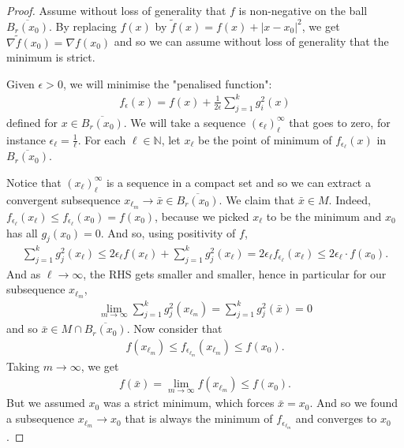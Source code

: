 \begin{proof}
	Assume without loss of generality that $f$ is non-negative on the ball $\overline{ B_{r}(x_{0}) }$. By replacing $f(x)$ by $\tilde{f}(x) = f(x) + \left| x-x_{0} \right|^{2}$, we get $\nabla \tilde{f}(x_{0}) = \nabla f(x_{0})$ and so we can assume without loss of generality that the minimum is strict.

    Given $\epsilon > 0$, we will minimise the "penalised function":
	\begin{align*}
		f_{\epsilon}(x) = f(x) + \frac{1}{2\epsilon}\sum_{j=1}^{k} g_{i}^{2}(x)
	\end{align*}
	defined for $x \in \overline{ B_{r}(x_{0}) }$. We will take a sequence $(\epsilon_{\ell})_{\ell}^{\infty}$ that goes to zero, for instance $\epsilon_{\ell} = \frac{1}{\ell}$. For each $\ell \in \mathbb{N}$, let $x_{\ell}$ be the point of minimum of $f_{\epsilon_{\ell}}(x)$ in $\overline{ B_{r}(x_{0}) } $. 

	Notice that $(x_{\ell})_{\ell}^{\infty}$ is a sequence in a compact set and so we can extract a convergent subsequence $x_{\ell_{m}} \to \bar{x} \in \overline{ B_{r}(x_{0}) }$. We claim that $\bar{x} \in M$. Indeed, $f_{\epsilon_{\ell}}(x_{\ell}) \leq f_{\epsilon_{\ell}}(x_{0}) = f(x_{0})$, because we picked $x_{\ell}$ to be the minimum and $x_{0}$ has all $g_{j}(x_{0}) = 0$. And so, using positivity of $f$,
	\begin{align*}
		\sum_{j=1}^{k} g_{j}^{2}(x_{\ell}) \leq 2\epsilon_{\ell}f(x_{\ell}) + \sum_{j=1}^{k} g_{j}^{2} (x_{\ell}) = 2\epsilon_{\ell} f_{\epsilon_{\ell}}(x_{\ell}) \leq 2\epsilon_{\ell} \cdot f(x_{0}).
	\end{align*}
	And as $\ell \to \infty$, the RHS gets smaller and smaller, hence in particular for our subsequence $x_{\ell_{m}}$,
	\begin{align*}
		\lim_{m \to \infty} \sum_{j=1}^{k} g_{j}^{2}(x_{\ell_{m}}) = \sum_{j=1}^{k} g_{j}^{2}(\bar{x}) = 0
	\end{align*}
	and so $\bar{x} \in M \cap \overline{ B _{r}(x_{0})}$. Now consider that
	\begin{align*}
		f(x_{\ell_{m}}) \leq f_{\epsilon_{\ell_{m}}}(x_{\ell_{m}}) \leq f(x_{0}).
	\end{align*}
	Taking $m \to \infty$, we get
	\begin{align*}
		f(\bar{x}) = \lim_{m \to \infty} f(x_{\ell_{m}}) \leq f(x_{0}).
	\end{align*}
	But we assumed $x_{0}$ was a strict minimum, which forces $\bar{x} = x_{0}$. And so we found a subsequence $x_{\ell_{m}} \to x_{0}$ that is always the minimum of $f_{\epsilon_{\ell_{m}}}$ and converges to $x_{0}$.


\end{proof}
